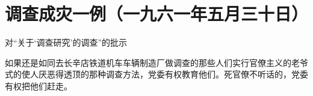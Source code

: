\section{调查成灾一例（一九六一年五月三十日）}


对“关于‘调查研究’的调查”的批示

如果还是如同去长辛店铁道机车车辆制造厂做调查的那些人们实行官僚主义的老爷式的使人厌恶得透顶的那种调查方法，党委有权教育他们。死官僚不听话的，党委有权把他们赶走。


